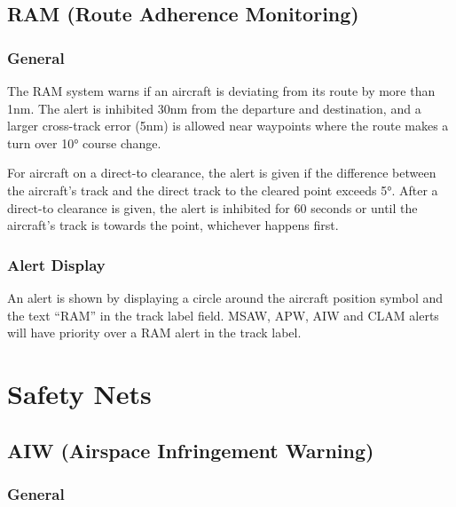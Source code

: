 \documentclass[a4paper,oneside,11pt]{memoir}
\begin{document}
\subsection{RAM (Route Adherence Monitoring)}
\label{tool:RAM}
\subsubsection*{General}

The RAM system warns if an aircraft is deviating from its route by more than 1nm. The alert is inhibited 30nm from the departure and destination, and a larger cross-track error (5nm) is allowed near waypoints where the route makes a turn over 10° course change.

\bigskip

For aircraft on a direct-to clearance, the alert is given if the difference between the aircraft’s track and the direct track to the cleared point exceeds 5°. After a direct-to clearance is given, the alert is inhibited for 60 seconds or until the aircraft’s track is towards the point, whichever happens first.

\subsubsection*{Alert Display}

An alert is shown by displaying a circle around the aircraft position symbol and the text “RAM” in the  track label field. MSAW, APW, AIW and CLAM alerts will have priority over a RAM alert in the track label.

\section{Safety Nets}



\subsection{AIW (Airspace Infringement Warning)}
\label{tool:AIW}
\subsubsection*{General}
\end{document}
